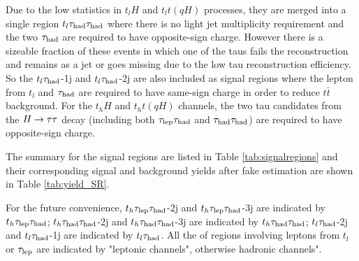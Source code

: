 Due to the low statistics in $t_lH$ and $t_lt(qH)$ processes, they are merged into a single region $t_l\tau_\text{had}{}\tau_\text{had}$ where there is no light jet multiplicity requirement and the two $\tau_\text{had}$ are required to have opposite-sign charge. However there is a sizeable fraction of these events in which one of the taus fails the reconstruction and remains as a jet or goes missing due to
the low tau reconstruction efficiency. So the $t_l\tau_\text{had}$-1j and $t_l\tau_\text{had}$-2j are also included as signal regions where the lepton from $t_l$ and $\tau_\text{had}$ are required to have same-sign
charge in order to reduce $t\bar t$ background. For the $t_hH$ and $t_ht(qH)$ channels, the two tau candidates from the $H \rightarrow \tau\tau$ decay (including both $\tau_\text{lep}{}\tau_\text{had}$ and $\tau_\text{had}{}\tau_\text{had}$) are required to have opposite-sign charge.  

The summary for the signal regions are listed in Table \ref{tab:signalregions} and their corresponding signal and background yields after fake estimation are shown
in Table \ref{tab:yield_SR}.

For the future convenience, $t_h\tau_\text{lep}{}\tau_\text{had}$-2j and $t_h\tau_\text{lep}{}\tau_\text{had}$-3j are indicated by $t_h\tau_\text{lep}{}\tau_\text{had}$; $t_h\tau_\text{had}{}\tau_\text{had}$-2j and $t_h\tau_\text{had}{}\tau_\text{had}$-3j are indicated by $t_h\tau_\text{had}{}\tau_\text{had}$; $t_l\tau_\text{had}$-2j and $t_l\tau_\text{had}$-1j are indicated by $t_l\tau_\text{had}$. All the of regions involving leptons from $t_l$ or $\tau_\text{lep}$ are indicated by "leptonic channels", otherwise hadronic channels".

